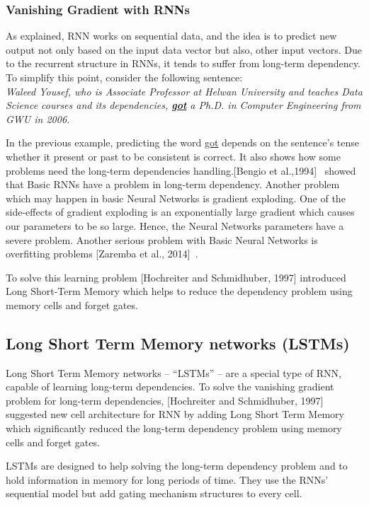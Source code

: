  \subsubsection{Vanishing Gradient with RNNs}\label{Sec:RNN_Vanishing}
 
As explained, RNN works on sequential data, and the idea is to predict new output not only based on the input data vector but also, other input vectors. Due to the recurrent structure in RNNs, it tends to suffer from long-term dependency. To simplify this point, consider the following sentence:\\
\textit{Waleed Yousef, who is Associate Professor at Helwan University and teaches Data Science courses and its dependencies, \textbf{\underline{got}} a Ph.D. in Computer Engineering from GWU in 2006.}

In the previous example, predicting the word \underline{got} depends on the sentence’s tense whether it present or past to be consistent is correct. It also shows how some problems need the long-term dependencies handling.[Bengio et al.,1994]~\cite{Bengio_1994} showed that Basic RNNs have a problem in long-term dependency.  Another problem which may happen in basic Neural Networks is gradient exploding. One of the side-effects of gradient exploding is an exponentially large gradient which causes our parameters to be so large. Hence, the Neural Networks parameters have a severe problem. Another serious problem with Basic Neural Networks is overfitting problems [Zaremba et al., 2014]~\cite{Zaremba_et_al}.

To solve this learning problem [Hochreiter and Schmidhuber, 1997] introduced Long Short-Term Memory which helps to reduce the dependency problem using memory cells and forget gates.%
\subsection{Long Short Term Memory networks (LSTMs)}\label{Sec:LSTM}


Long Short Term Memory networks – “LSTMs” – are a special type of RNN, capable of learning long-term dependencies. To solve the vanishing gradient problem for long-term dependencies, [Hochreiter and Schmidhuber, 1997]~\cite{Hochreiter} suggested new cell architecture for RNN by adding Long Short Term Memory which significantly reduced the long-term dependency problem using memory cells and forget gates.

LSTMs are designed to help solving the long-term dependency problem and to hold information in memory for long periods of time. They use the RNNs’ sequential model but add gating mechanism structures to every cell.

